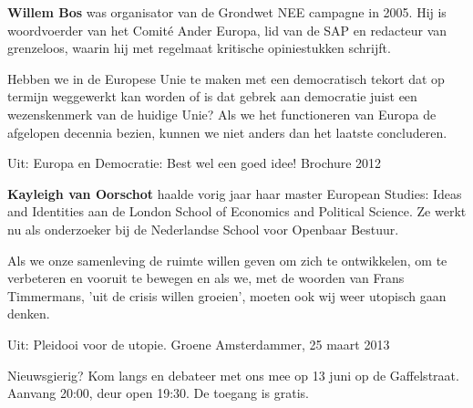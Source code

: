 \documentclass{article}
\begin{document}
\vfill


\vfill

\textbf{Willem Bos} was organisator van de Grondwet NEE campagne in 2005. Hij is
woordvoerder van het Comit\'e Ander Europa, lid van de SAP en redacteur van
grenzeloos, waarin hij met regelmaat kritische opiniestukken schrijft.
\begin{myquote}
  Hebben we in de Europese Unie te maken met een democratisch tekort dat op
  termijn weggewerkt kan worden of is dat gebrek aan democratie juist een
  wezenskenmerk van de huidige Unie? Als we het functioneren van Europa de
  afgelopen decennia bezien, kunnen we niet anders dan het laatste concluderen.
\end{myquote}
{\footnotesize Uit: Europa en Democratie: Best wel een goed idee! Brochure 2012}

\vfill

\textbf{Kayleigh van Oorschot} haalde vorig jaar haar master European Studies: Ideas and
Identities aan de London School of Economics and Political Science. Ze werkt nu
als onderzoeker bij de Nederlandse School voor Openbaar Bestuur.
\begin{myquote}
  Als we onze samenleving de ruimte willen geven om zich te ontwikkelen, om te
  verbeteren en vooruit te bewegen en als we, met de woorden van Frans
  Timmermans, 'uit de crisis willen groeien', moeten ook wij weer utopisch gaan
  denken.
\end{myquote}
{\footnotesize Uit: Pleidooi voor de utopie. Groene Amsterdammer, 25 maart 2013}

\vfill

Nieuwsgierig? Kom langs en debateer met ons mee op 13 juni op de Gaffelstraat.
Aanvang 20:00, deur open 19:30. De toegang is gratis.

\myhline
\end{document}
